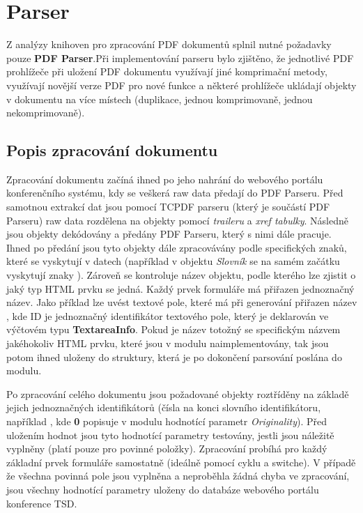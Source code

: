 \section{Parser}
Z analýzy knihoven pro zpracování PDF dokumentů splnil nutné požadavky pouze \textbf{PDF Parser}.Při implementování parseru bylo zjištěno, že jednotlivé PDF prohlížeče při uložení PDF dokumentu využívají jiné komprimační metody, využívají novější verze PDF pro nové funkce a některé prohlížeče ukládají objekty v dokumentu na více místech (duplikace, jednou komprimovaně, jednou nekomprimovaně).

\subsection{Popis zpracování dokumentu}
Zpracování dokumentu začíná ihned po jeho nahrání do webového portálu konferenčního systému, kdy se veškerá raw data předají do PDF Parseru. Před samotnou extrakcí dat jsou pomocí TCPDF parseru (který je součástí PDF Parseru) raw data rozdělena na objekty pomocí \textit{traileru} a \textit{xref tabulky}. Následně jsou objekty dekódovány a předány PDF Parseru, který s nimi dále pracuje. Ihned po předání jsou tyto objekty dále zpracovávány podle specifických znaků, které se vyskytují v datech (například v objektu \textit{Slovník} se na samém začátku vyskytují znaky \uv{<<}). Zároveň se kontroluje název objektu, podle kterého lze zjistit o jaký typ HTML prvku se jedná. Každý prvek formuláře má přiřazen jednoznačný název. Jako příklad lze uvést textové pole, které má při generování přiřazen název , kde ID je jednoznačný identifikátor textového pole, který je deklarován ve výčtovém typu \textbf{TextareaInfo}. Pokud je název totožný se specifickým názvem jakéhokoliv HTML prvku, které jsou v modulu naimplementovány, tak jsou potom ihned uloženy do struktury, která je po dokončení parsování poslána do modulu. 
\par
Po zpracování celého dokumentu jsou požadované objekty roztříděny na základě jejich jednoznačných identifikátorů (čísla na konci slovního identifikátoru, například , kde \textbf{0} popisuje v modulu hodnotící parametr \textit{Originality}). Před uložením hodnot jsou tyto hodnotící parametry testovány, jestli jsou náležitě vyplněny (platí pouze pro povinné položky). Zpracování probíhá pro každý základní prvek formuláře samostatně (ideálně pomocí cyklu a switche). V případě že všechna povinná pole jsou vyplněna a neproběhla žádná chyba ve zpracování, jsou všechny hodnotící parametry uloženy do databáze webového portálu konference TSD.
